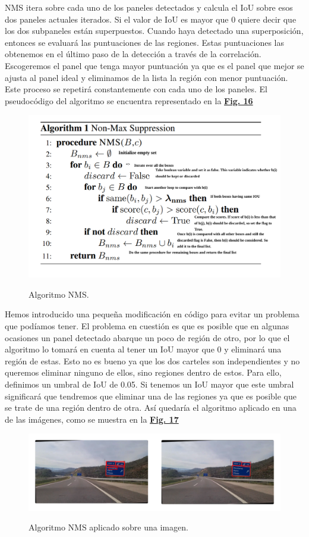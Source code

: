 \documentclass[a4paper, 12pt]{article}
\begin{document}
NMS itera sobre cada uno de los paneles detectados y calcula el IoU sobre esos dos paneles actuales iterados. Si el valor de IoU es mayor que 0 quiere decir que los dos subpaneles están superpuestos. Cuando haya detectado una superposición, entonces se evaluará las puntuaciones de las regiones. Estas puntuaciones las obtenemos en el último paso de la detección a través de la correlación. Escogeremos el panel que tenga mayor puntuación ya que es el panel que mejor se ajusta al panel ideal y eliminamos de la lista la región con menor puntuación. Este proceso se repetirá constantemente con cada uno de los paneles. El pseudocódigo del algoritmo se encuentra representado en la \textbf{\hyperref[fig:nms]{Fig. 16}}
\begin{figure}[h]
	\centering
	\caption{Algoritmo NMS.}\vspace{0.5cm}
	\includegraphics[width=0.7\linewidth]{img/nms.png}
	\label{fig:nms}
\end{figure}

Hemos introducido una pequeña modificación en código para evitar un problema que podíamos tener. El problema en cuestión es que es posible que en algunas ocasiones un panel detectado abarque un poco de región de otro, por lo que el algoritmo lo tomará en cuenta al tener un IoU mayor que 0 y eliminará una región de estas. Esto no es bueno ya que los dos carteles son independientes y no queremos eliminar ninguno de ellos, sino regiones dentro de estos. Para ello, definimos un umbral de IoU de 0.05. Si tenemos un IoU mayor que este umbral significará que tendremos que eliminar una de las regiones ya que es posible que se trate de una región dentro de otra. Así quedaría el algoritmo aplicado en una de las imágenes, como se muestra en la \textbf{\hyperref[fig:nmsAplicado]{Fig. 17}}
\begin{figure}[h]
	\centering
	\caption{Algoritmo NMS aplicado sobre una imagen.}\vspace{0.5cm}
	\includegraphics[width=1\linewidth]{img/nmsAplicado.png}
	\label{fig:nmsAplicado}
\end{figure}
\end{document}

